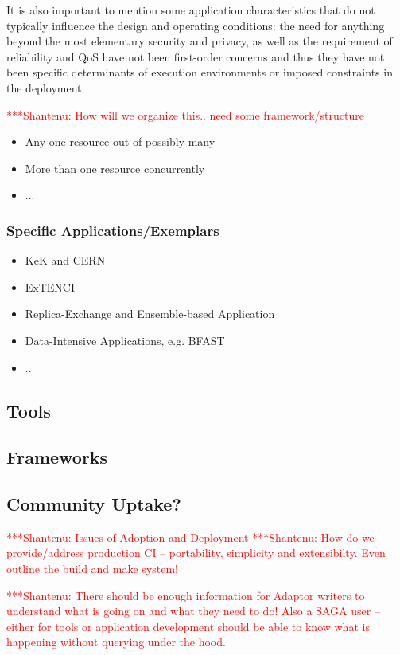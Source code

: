 \documentclass[a4paper,10pt]{article}
\newcommand{\jhanote}[1]{  {\textcolor{red}     { ***Shantenu: #1 }}}
\newcommand{\jhanote}[1]{}
\begin{document}
 It is also important to mention some application characteristics that
 do not typically influence the design and operating conditions: the
 need for anything beyond the most elementary security and privacy, as
 well as the requirement of reliability and QoS have not been
 first-order concerns and thus they have not been specific
 determinants of execution environments or imposed constraints in the
 deployment.

\jhanote{How will we organize this.. need some framework/structure}

\begin{itemize}
\item Any one resource out of possibly many
\item More than one resource concurrently
\item ...
\end{itemize}

\subsubsection{Specific Applications/Exemplars}

\begin{itemize}
\item KeK and CERN
\item ExTENCI
\item Replica-Exchange and Ensemble-based Application
\item Data-Intensive Applications, e.g. BFAST
\item .. 
\end{itemize}


 \subsection{Tools}
 \subsection{Frameworks}

 \subsection{Community Uptake?}

 \jhanote{Issues of Adoption and Deployment} \jhanote{How do we
   provide/address production CI -- portability, simplicity and
   extensibilty. Even outline the build and make system!}

 \jhanote{There should be enough information for Adaptor writers to
   understand what is going on and what they need to do! Also a SAGA
   user -- either for tools or application development should be able
   to know what is happening without querying under the hood.}
   
\end{document}

